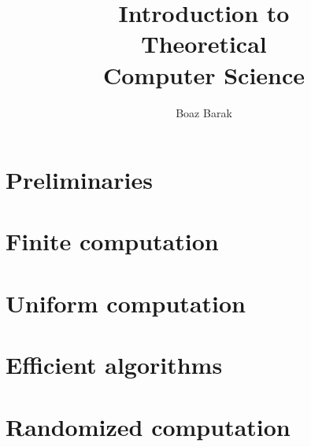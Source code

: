 \documentclass[nofonts, nobib]{tufte-book}
\title{Introduction to \\ \noindent Theoretical \\ \noindent Computer Science}
\author[Boaz Barak]{Boaz Barak}
\begin{document}




\mainmatter


\setcounter{chapter}{-1}


\part*{Preliminaries}










\part{Finite computation}




%

\part{Uniform computation}



%





\part{Efficient algorithms}






%






\part{Randomized computation}




%
\end{document}
